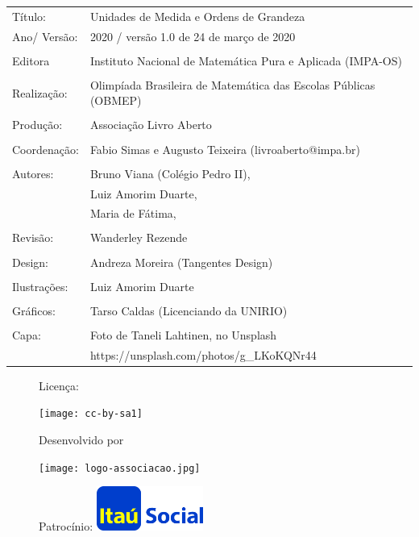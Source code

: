 \begin{tabular}{p{}p{}}
Título: & Unidades de Medida e Ordens de Grandeza\\
Ano/ Versão: & 2020 / versão 1.0 de 24 de março de 2020\\
\\
Editora & Instituto Nacional de Matem\'atica Pura e Aplicada (IMPA-OS)\\
\\
Realização:& Olimp\'iada Brasileira de Matem\'atica das Escolas P\'ublicas (OBMEP)\\
\\
Produção:& Associação Livro Aberto\\
\\
Coordenação: & Fabio Simas e Augusto Teixeira (livroaberto@impa.br)\\
\\
Autores: & Bruno Viana (Colégio Pedro II), \\
 		 & Luiz Amorim Duarte, \\
 		 & Maria de Fátima,\\
\\
Revisão: & Wanderley Rezende \\
\\
Design: & Andreza Moreira (Tangentes Design) \\
\\
Ilustrações: & Luiz Amorim Duarte \\ 
\\
Gráficos: & Tarso Caldas (Licenciando da UNIRIO) \\
\\
Capa: & Foto de Taneli Lahtinen, no Unsplash \\
	  & https://unsplash.com/photos/g\_LKoKQNr44 \\

\end{tabular}
\vspace{.5cm}


\begin{figure}[b]
\begin{minipage}[l]{5cm}
\centering

{\large Licença:}

  \texttt{[image: cc-by-sa1]}
\end{minipage}\hfill
\begin{minipage}[c]{5cm}
\centering
{\large Desenvolvido por}

\texttt{[image: logo-associacao.jpg]}
\end{minipage}
\begin{minipage}[r]{5cm}
\centering

{\large Patrocínio:}
  \vspace{1em}
  \includegraphics[width=3.5cm]{itau}
\end{minipage}
\end{figure}

